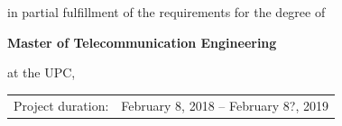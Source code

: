 \begin{titlepage}
\begin{center}
\bigskip
\bigskip

{\makeatletter
\titlefont\Large\@author
\makeatother}

\bigskip
\bigskip

in partial fulfillment of the requirements for the degree of

\bigskip
\bigskip

{\bfseries Master of Telecommunication Engineering}

\bigskip
\bigskip

at the UPC,


\vfill

\begin{tabular}{lll}
    Project duration: & \multicolumn{2}{l}{February 8, 2018 -- February 8?, 2019} \\
       
\end{tabular}


\end{center}
\end{titlepage}
